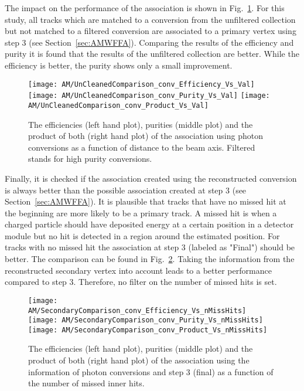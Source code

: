 The impact on the performance of the association is shown in Fig.~\ref{plot:AMWFSVpcEffAndPurRT}. For this study, all tracks which are matched to a conversion from the unfiltered collection but not matched to a filtered conversion are associated to a primary vertex using step 3 (see Section~\ref{sec:AMWFFA}). Comparing the results of the efficiency and purity it is found that the results of the unfiltered collection are better. While the efficiency is better, the purity shows only a small improvement.

\begin{figure}[Ht]
    \centering
    \texttt{[image: AM/UnCleanedComparison\_conv\_Efficiency\_Vs\_Val]}
    \texttt{[image: AM/UnCleanedComparison\_conv\_Purity\_Vs\_Val]}
    \texttt{[image: AM/UnCleanedComparison\_conv\_Product\_Vs\_Val]}
    \caption[Efficiencies, purities and their product of the association using different photon conversion collections as a function of distance to the beam axis]{The efficiencies (left hand plot), purities (middle plot) and the product of both (right hand plot) of the association using photon conversions as a function of distance to the beam axis. Filtered stands for high purity conversions.\label{plot:AMWFSVpcEffAndPurRT}}
\end{figure}

Finally, it is checked if the association created using the reconstructed conversion is always better than the possible association created at step 3 (see Section~\ref{sec:AMWFFA}). It is plausible that tracks that have no missed hit at the beginning are more likely to be a primary track. A missed hit is when a charged particle should have deposited energy at a certain position in a detector module but no hit is detected in a region around the estimated position. For tracks with no missed hit the association at step 3 (labeled as "Final") should be better. The comparison can be found in Fig.~\ref{plot:AMWFSVpcEffAndPurVsFA}. Taking the information from the reconstructed secondary vertex into account leads to a better performance compared to step 3. Therefore, no filter on the number of missed hits is set.

\begin{figure}[Ht]
    \centering
    \texttt{[image: AM/SecondaryComparison\_conv\_Efficiency\_Vs\_nMissHits]}
    \texttt{[image: AM/SecondaryComparison\_conv\_Purity\_Vs\_nMissHits]}
    \texttt{[image: AM/SecondaryComparison\_conv\_Product\_Vs\_nMissHits]}
    \caption[Efficiencies, purities and their product of the association using photon conversions \vs{} step 3 as a function of missed inner hits]{The efficiencies (left hand plot), purities (middle plot) and the product of both (right hand plot) of the association using the information of photon conversions and step 3 (final) as a function of the number of missed inner hits.\label{plot:AMWFSVpcEffAndPurVsFA}}
\end{figure}

